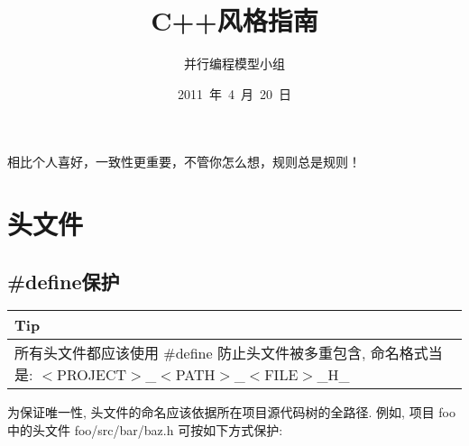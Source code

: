 \documentclass[a4paper,11pt,CJK]{article}
\begin{document}
\begin{CJK}{UTF8}{gbsn} %
\setlength{\parindent}{2em}
\pagestyle{fancy}
\title{C++风格指南}
\author{并行编程模型小组}
\date{2011~年~4~月~20~日}
\maketitle
\noindent
\hspace{2ex} \Large{相比个人喜好，一致性更重要，不管你怎么想，规则总是规则！}
\newpage
\tableofcontents
\newpage
\section{头文件}
\subsection{ \#define保护}
\begin{table}[htbp]
\flushleft
\begin{tabular}{p{400pt}}
\toprule
\rowcolor[gray]{.8} Tip \\
\midrule
所有头文件都应该使用 \#define 防止头文件被多重包含, 命名格式当是: $<$PROJECT$>$\_$<$PATH$>$\_$<$FILE$>$\_H\_ \\
\bottomrule
\end{tabular}
\end{table}
为保证唯一性, 头文件的命名应该依据所在项目源代码树的全路径. 例如, 项目 foo 中的头文件 foo/src/bar/baz.h 可按如下方式保护: \\
\\



\end{CJK}
\end{document}
